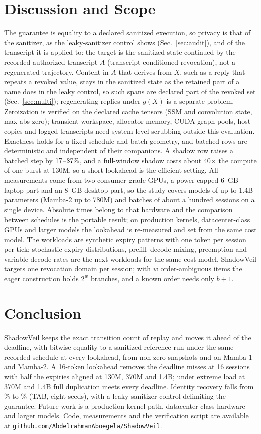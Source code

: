 \documentclass[conference]{IEEEtran}
\begin{document}
\section{Discussion and Scope}\label{sec:limits}
The guarantee is equality to a declared sanitized execution, so privacy is that of the sanitizer, as the leaky-sanitizer control shows (Sec.~\ref{sec:audit}),
and of the transcript it is applied to: the target is the sanitized state continued by the recorded authorized transcript $A$ (transcript-conditioned revocation),
not a regenerated trajectory. Content in $A$ that derives from $X$, such as a reply that repeats a revoked value, stays in the sanitized state as the retained part of a name does in the leaky control,
so such spans are declared part of the revoked set (Sec.~\ref{sec:multi}); regenerating replies under $g(X)$ is a separate problem.
Zeroization is verified on the declared cache tensors (SSM and convolution state, max-abs zero); transient workspace, allocator memory, CUDA-graph pools, host copies and logged transcripts need system-level scrubbing outside this evaluation.
Exactness holds for a fixed schedule and batch geometry, and batched rows are deterministic and independent of their companions. A shadow row raises a batched step by $17$--$37\%$, and a full-window shadow costs about
40$\times$ the compute of one burst at 130M, so a short lookahead is the efficient setting.
All measurements come from two consumer-grade GPUs, a power-capped 6~GB laptop part and an 8~GB desktop part, so the study covers models of up to 1.4B
parameters (Mamba-2 up to 780M) and batches of about a hundred sessions on a single device. Absolute times belong to that hardware and the comparison between schedules
is the portable result; on production kernels, datacenter-class GPUs and larger models the lookahead is re-measured and set from the same cost model.
The workloads are synthetic expiry patterns with one token per session per tick; stochastic expiry distributions, prefill--decode mixing, preemption and variable decode rates are the next workloads for the same cost model.
ShadowVeil targets one revocation domain per session; with $w$ order-ambiguous items the eager construction holds $2^w$ branches, and a known order needs only $b+1$.

\section{Conclusion}
ShadowVeil keeps the exact transition count of replay and moves it ahead of the deadline, with bitwise equality to a sanitized
reference run under the same recorded schedule at every lookahead, from non-zero snapshots and on Mamba-1 and Mamba-2. A 16-token lookahead
removes the deadline misses at 16 sessions with half the expiries aligned at 130M, 370M and 1.4B; under extreme load at 370M and 1.4B full duplication meets every deadline. Identity
recovery falls from \nTUTabA\% to \nTSTabA\% (TAB, eight seeds), with a leaky-sanitizer control
delimiting the guarantee. Future work is a production-kernel path, datacenter-class hardware and larger models. Code, measurements and the verification script are available at \texttt{github.com/\allowbreak{}AbdelrahmanAboegela/\allowbreak{}ShadowVeil}.
\end{document}
